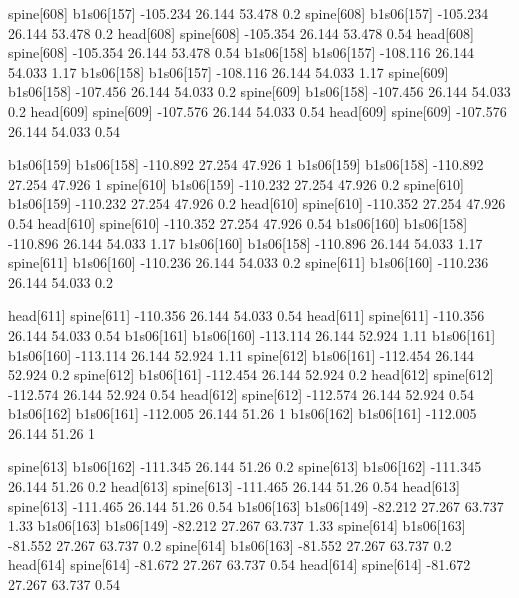spine[608]    b1s06[157]    -105.234    26.144    53.478    0.2
spine[608]    b1s06[157]    -105.234    26.144    53.478    0.2
head[608]    spine[608]    -105.354    26.144    53.478    0.54
head[608]    spine[608]    -105.354    26.144    53.478    0.54
b1s06[158]    b1s06[157]    -108.116    26.144    54.033    1.17
b1s06[158]    b1s06[157]    -108.116    26.144    54.033    1.17
spine[609]    b1s06[158]    -107.456    26.144    54.033    0.2
spine[609]    b1s06[158]    -107.456    26.144    54.033    0.2
head[609]    spine[609]    -107.576    26.144    54.033    0.54
head[609]    spine[609]    -107.576    26.144    54.033    0.54


b1s06[159]    b1s06[158]    -110.892    27.254    47.926    1
b1s06[159]    b1s06[158]    -110.892    27.254    47.926    1
spine[610]    b1s06[159]    -110.232    27.254    47.926    0.2
spine[610]    b1s06[159]    -110.232    27.254    47.926    0.2
head[610]    spine[610]    -110.352    27.254    47.926    0.54
head[610]    spine[610]    -110.352    27.254    47.926    0.54
b1s06[160]    b1s06[158]    -110.896    26.144    54.033    1.17
b1s06[160]    b1s06[158]    -110.896    26.144    54.033    1.17
spine[611]    b1s06[160]    -110.236    26.144    54.033    0.2
spine[611]    b1s06[160]    -110.236    26.144    54.033    0.2


head[611]    spine[611]    -110.356    26.144    54.033    0.54
head[611]    spine[611]    -110.356    26.144    54.033    0.54
b1s06[161]    b1s06[160]    -113.114    26.144    52.924    1.11
b1s06[161]    b1s06[160]    -113.114    26.144    52.924    1.11
spine[612]    b1s06[161]    -112.454    26.144    52.924    0.2
spine[612]    b1s06[161]    -112.454    26.144    52.924    0.2
head[612]    spine[612]    -112.574    26.144    52.924    0.54
head[612]    spine[612]    -112.574    26.144    52.924    0.54
b1s06[162]    b1s06[161]    -112.005    26.144    51.26    1
b1s06[162]    b1s06[161]    -112.005    26.144    51.26    1


spine[613]    b1s06[162]    -111.345    26.144    51.26    0.2
spine[613]    b1s06[162]    -111.345    26.144    51.26    0.2
head[613]    spine[613]    -111.465    26.144    51.26    0.54
head[613]    spine[613]    -111.465    26.144    51.26    0.54
b1s06[163]    b1s06[149]    -82.212    27.267    63.737    1.33
b1s06[163]    b1s06[149]    -82.212    27.267    63.737    1.33
spine[614]    b1s06[163]    -81.552    27.267    63.737    0.2
spine[614]    b1s06[163]    -81.552    27.267    63.737    0.2
head[614]    spine[614]    -81.672    27.267    63.737    0.54
head[614]    spine[614]    -81.672    27.267    63.737    0.54


